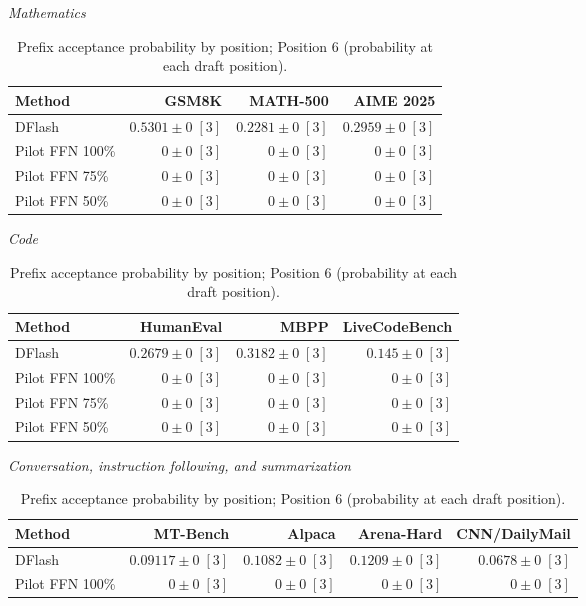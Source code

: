 \documentclass[conference,onecolumn]{IEEEtran}
\begin{document}
\begin{table}[!htp]
\centering\small
\setlength{\tabcolsep}{3pt}
\caption{Prefix acceptance probability by position; Position 6 (probability at each draft position).}
\label{tab:appendix-metric-prefix-survival-6}
\textit{Mathematics}\par\smallskip
\begin{tabular}{@{}>{\raggedright\arraybackslash}p{3.7cm}rrr@{}}
\toprule
Method & GSM8K & MATH-500 & AIME 2025 \\
\midrule
DFlash & \(\mathbf{0.5301} \pm 0\;[3]\) & \(\mathbf{0.2281} \pm 0\;[3]\) & \(\mathbf{0.2959} \pm 0\;[3]\) \\
Pilot FFN 100\% & \(0 \pm 0\;[3]\) & \(0 \pm 0\;[3]\) & \(0 \pm 0\;[3]\) \\
Pilot FFN 75\% & \(0 \pm 0\;[3]\) & \(0 \pm 0\;[3]\) & \(0 \pm 0\;[3]\) \\
Pilot FFN 50\% & \(0 \pm 0\;[3]\) & \(0 \pm 0\;[3]\) & \(0 \pm 0\;[3]\) \\
\bottomrule
\end{tabular}\par\medskip
\textit{Code}\par\smallskip
\begin{tabular}{@{}>{\raggedright\arraybackslash}p{3.7cm}rrr@{}}
\toprule
Method & HumanEval & MBPP & LiveCodeBench \\
\midrule
DFlash & \(\mathbf{0.2679} \pm 0\;[3]\) & \(\mathbf{0.3182} \pm 0\;[3]\) & \(\mathbf{0.145} \pm 0\;[3]\) \\
Pilot FFN 100\% & \(0 \pm 0\;[3]\) & \(0 \pm 0\;[3]\) & \(0 \pm 0\;[3]\) \\
Pilot FFN 75\% & \(0 \pm 0\;[3]\) & \(0 \pm 0\;[3]\) & \(0 \pm 0\;[3]\) \\
Pilot FFN 50\% & \(0 \pm 0\;[3]\) & \(0 \pm 0\;[3]\) & \(0 \pm 0\;[3]\) \\
\bottomrule
\end{tabular}\par\medskip
\textit{Conversation, instruction following, and summarization}\par\smallskip
\begin{tabular}{@{}>{\raggedright\arraybackslash}p{3.7cm}rrrr@{}}
\toprule
Method & MT-Bench & Alpaca & Arena-Hard & CNN/DailyMail \\
\midrule
DFlash & \(\mathbf{0.09117} \pm 0\;[3]\) & \(\mathbf{0.1082} \pm 0\;[3]\) & \(\mathbf{0.1209} \pm 0\;[3]\) & \(\mathbf{0.0678} \pm 0\;[3]\) \\
Pilot FFN 100\% & \(0 \pm 0\;[3]\) & \(0 \pm 0\;[3]\) & \(0 \pm 0\;[3]\) & \(0 \pm 0\;[3]\) \\

\end{tabular}
\end{table}
\end{document}
